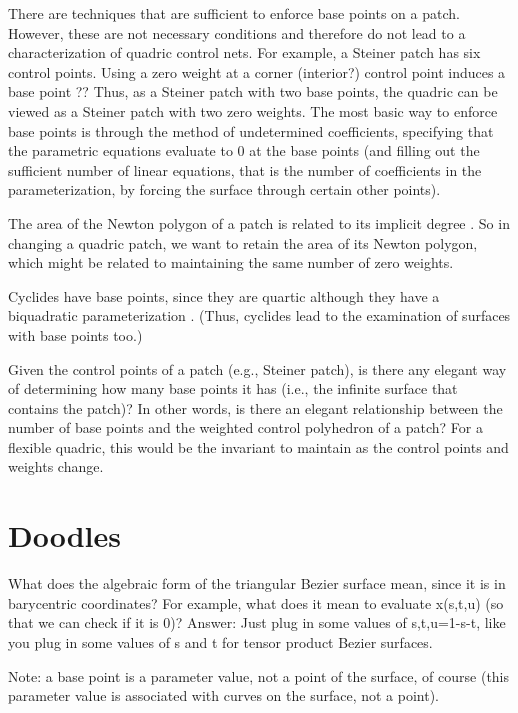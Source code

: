 There are techniques that are sufficient
to enforce base points on a patch.
However, these are not necessary conditions
and therefore do not lead to a characterization
of quadric control nets.
For example, a Steiner patch has six control points.
Using a zero weight at a corner (interior?)
control point induces a base point \cite{Warren92}??
Thus, as a Steiner patch with two base points,
the quadric can be viewed as a Steiner patch
with two zero weights.
The most basic way to enforce base points is through
the method of undetermined coefficients, specifying
that the parametric equations evaluate to 0 at the
base points (and filling out the sufficient number
of linear equations, that is the number of coefficients
in the parameterization, by forcing the surface 
through certain other points).

The area of the Newton polygon of a patch
is related to its implicit degree \cite{Warren92}.
So in changing a quadric patch, we want to
retain the area of its Newton polygon, which
might be related to maintaining the same number
of zero weights.

Cyclides have base points, since they are quartic
although they have a biquadratic parameterization \cite{Zhou91}.
(Thus, cyclides lead to the examination
of surfaces with base points too.)

Given the control points of a patch (e.g.,
Steiner patch), is there any elegant way of 
determining how many base points it has
(i.e., the infinite surface that contains the patch)?
In other words, is there an elegant relationship
between the number of base points and the
weighted control polyhedron of a patch?
For a flexible quadric, this would be the 
invariant to maintain as the control points 
and weights change.

\section{Doodles}

What does the algebraic form of the triangular
Bezier surface mean, since it is in barycentric
coordinates?  For example, what does it mean
to evaluate x(s,t,u) (so that we can check if 
it is 0)?  
Answer: Just plug in some values of s,t,u=1-s-t,
like you plug in some values of s and t for
tensor product Bezier surfaces.

Note: a base point is a parameter value, not 
a point of the surface, of course (this
parameter value is associated with curves on
the surface, not a point).

